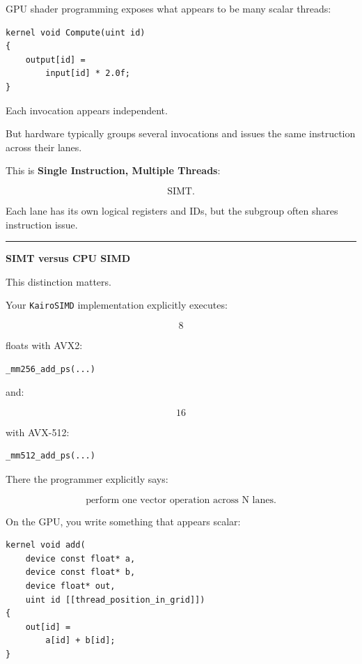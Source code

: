 GPU shader programming exposes what appears to be many scalar threads:

\protect{}\label{e937zu}%
\begin{verbatim}
kernel void Compute(uint id)
{
    output[id] =
        input[id] * 2.0f;
}
\end{verbatim}

Each invocation appears independent.

But hardware typically groups several invocations and issues the same instruction across their lanes.

This is \textbf{Single Instruction, Multiple Threads}:

\[
\boxed{\text{SIMT}.}
\]

Each lane has its own logical registers and IDs, but the subgroup often shares instruction issue.

\begin{center}\rule{0.5\linewidth}{0.5pt}\end{center}

\textbf{SIMT versus CPU SIMD}

This distinction matters.

Your \texttt{KairoSIMD} implementation explicitly executes:

\[
8
\]

floats with AVX2:

\protect{}\label{qpohrx}%
\begin{verbatim}
_mm256_add_ps(...)
\end{verbatim}

and:

\[
16
\]

with AVX-512:

\protect{}\label{6vk2sf}%
\begin{verbatim}
_mm512_add_ps(...)
\end{verbatim}

There the programmer explicitly says:

\[
\boxed{\text{perform one vector operation across N lanes}.}
\]

On the GPU, you write something that appears scalar:

\protect{}\label{2o38s4}%
\begin{verbatim}
kernel void add(
    device const float* a,
    device const float* b,
    device float* out,
    uint id [[thread_position_in_grid]])
{
    out[id] =
        a[id] + b[id];
}
\end{verbatim}

